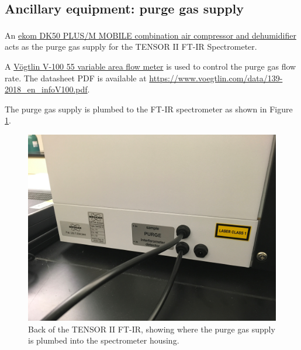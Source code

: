 \subsection{Ancillary equipment: purge gas supply}
An \href{http://www.ekom.sk/en/products/industrial-compressors/mobile-compressors/industrial-compressor-dk50-plus-mobile/}{ekom\textsuperscript{\textregistered} DK50 PLUS/M MOBILE combination air compressor and dehumidifier} acts as the purge gas supply for the TENSOR II FT-IR Spectrometer. %

A \href{https://www.voegtlin.com/en/variable-area-flowmeters-and-control-valves/va-flowmeters-v-100/}{V\"{o}gtlin V-100 55 variable area flow meter} is used to control the purge gas flow rate. The datasheet PDF is available at \url{https://www.voegtlin.com/data/139-2018_en_infoV100.pdf}.

The purge gas supply is plumbed to the FT-IR spectrometer as shown in Figure \ref{FTIRgas}.
\begin{figure}[htb]
\begin{center}
\includegraphics[width=6.5in]{purgeplumbing.jpg}
\caption{Back of the TENSOR II FT-IR, showing where the purge gas supply is plumbed into the spectrometer housing.}
\label{FTIRgas}
\end{center}
\end{figure}

